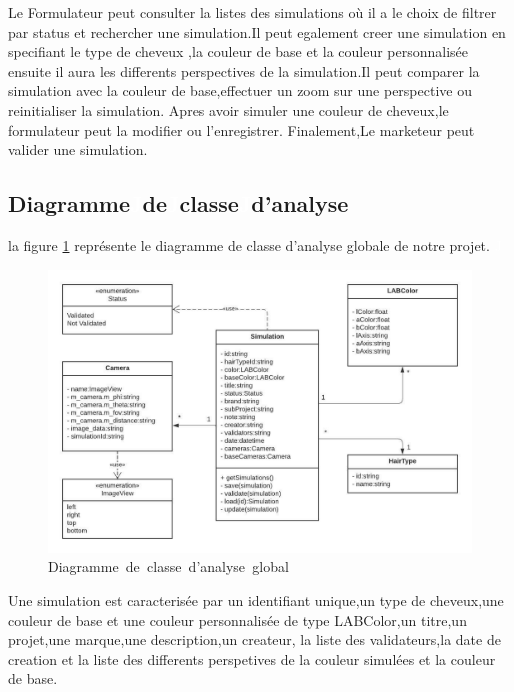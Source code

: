 Le Formulateur peut consulter la listes des simulations où il a le choix de filtrer par status et rechercher une simulation.Il peut egalement creer une simulation en specifiant le type de cheveux ,la couleur de base et la couleur personnalisée ensuite il aura les differents perspectives de la simulation.Il peut comparer la simulation avec la couleur de base,effectuer un zoom sur une perspective ou reinitialiser la simulation.
Apres avoir simuler une couleur de cheveux,le formulateur peut la modifier ou l'enregistrer.
Finalement,Le marketeur peut valider une simulation.

\newpage
\subsection{Diagramme\textcolor{white}{J}de\textcolor{white}{J}classe\textcolor{white}{J}d'analyse}
la figure \ref{fig:usecasegenerale} représente le diagramme de classe d'analyse globale de notre projet.
\textcolor{white}{J} \begin{figure}[!ht]
\centering
\includegraphics[width=1\textwidth,angle=00]{chapitres/chapitre2/figures/Diagramme de classe global.jpeg}
\caption{Diagramme\textcolor{white}{J}de\textcolor{white}{J}classe\textcolor{white}{J}d'analyse\textcolor{white}{J}global}
\label{fig:usecasegenerale}
\end{figure}
Une simulation est caracterisée par un identifiant unique,un type de cheveux,une couleur de base et une couleur personnalisée de type LABColor,un titre,un projet,une marque,une description,un createur, la liste des validateurs,la date de creation et la liste des differents perspetives de la couleur simulées et la couleur de base.


